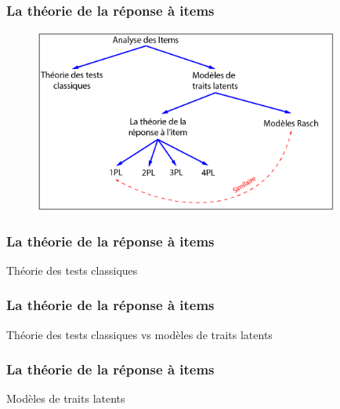 \documentclass[aspectratio=169,professionalfonts, 12pt]{beamer}
\begin{document}
\begin{frame}
  \frametitle{La théorie de la réponse à items}
  \justifying 
  \begin{minipage}{\textwidth}
  \begin{figure}[H]
      \includegraphics[height=6cm]{images/etat_art/items_analysis.png}
  \end{figure}
  \end{minipage}
\end{frame}


\begin{frame}
  \frametitle{La théorie de la réponse à items}
  \justifying 
  \begin{minipage}{\textwidth}
  \begin{block}{Théorie des tests classiques}
  \end{block}  
  \end{minipage} 
\end{frame}

\begin{frame}
  \frametitle{La théorie de la réponse à items}
  \justifying 
  \begin{minipage}{\textwidth}
  \begin{block}{Théorie des tests classiques vs modèles de traits latents}
  \end{block}  
  \end{minipage} 
\end{frame}

\begin{frame}
  \frametitle{La théorie de la réponse à items}
  \justifying 
  \begin{minipage}{\textwidth}
  \begin{block}{Modèles de traits latents}
  \end{block}  
  \end{minipage} 
\end{frame}
\end{document}
